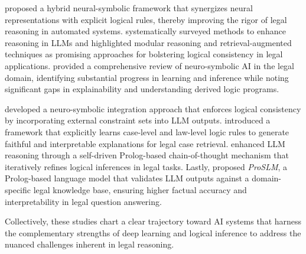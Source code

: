 \citet{wei2005} proposed a hybrid neural-symbolic framework that synergizes neural representations with explicit logical rules, thereby improving the rigor of legal reasoning in automated systems. \citet{patil2025} systematically surveyed methods to enhance reasoning in LLMs and highlighted modular reasoning and retrieval-augmented techniques as promising approaches for bolstering logical consistency in legal applications. \citet{colelough2025} provided a comprehensive review of neuro-symbolic AI in the legal domain, identifying substantial progress in learning and inference while noting significant gaps in explainability and understanding derived logic programs. 

\citet{calanzone2024} developed a neuro-symbolic integration approach that enforces logical consistency by incorporating external constraint sets into LLM outputs. \citet{sun2024} introduced a framework that explicitly learns case-level and law-level logic rules to generate faithful and interpretable explanations for legal case retrieval. \citet{tan2024} enhanced LLM reasoning through a self-driven Prolog-based chain-of-thought mechanism that iteratively refines logical inferences in legal tasks. Lastly, \citet{Vakharia_2024} proposed \textit{ProSLM}, a Prolog-based language model that validates LLM outputs against a domain-specific legal knowledge base, ensuring higher factual accuracy and interpretability in legal question answering.

Collectively, these studies chart a clear trajectory toward AI systems that harness the complementary strengths of deep learning and logical inference to address the nuanced challenges inherent in legal reasoning.



